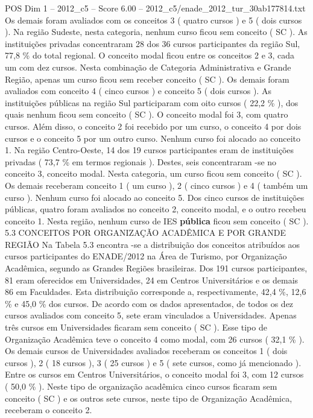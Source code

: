 \begin{textsample}{POS Dim 1 – 2012\_c5 – Score 6.00 – 2012\_c5/enade\_2012\_tur\_30ab177814.txt}
Os demais foram avaliados com os conceitos 3 ( quatro cursos ) e 5 ( dois cursos ).
Na região Sudeste, nesta categoria, nenhum curso ficou sem conceito ( SC ).
As instituições privadas concentraram 28 dos 36 cursos participantes da região Sul, 77,8 \% do total regional.
O conceito modal ficou entre os conceitos 2 e 3, cada um com dez cursos.
Nesta combinação de Categoria Administrativa e Grande Região, apenas um curso ficou sem receber conceito ( SC ).
Os demais foram avaliados com conceito 4 ( cinco cursos ) e conceito 5 ( dois cursos ).
As instituições públicas na região Sul participaram com oito cursos ( 22,2 \% ), dos quais nenhum ficou sem conceito ( SC ).
O conceito modal foi 3, com quatro cursos.
Além disso, o conceito 2 foi recebido por um curso, o conceito 4 por dois cursos e o conceito 5 por um outro curso.
Nenhum curso foi alocado ao conceito 1.
Na região Centro-Oeste, 14 dos 19 cursos participantes eram de instituições privadas ( 73,7 \% em termos regionais ).
Destes, seis concentraram -se no conceito 3, conceito modal.
Nesta categoria, um curso ficou sem conceito ( SC ).
Os demais receberam conceito 1 ( um curso ), 2 ( cinco cursos ) e 4 ( também um curso ).
Nenhum curso foi alocado ao conceito 5.
Dos cinco cursos de instituições públicas, quatro foram avaliados no conceito 2, conceito modal, e o outro recebeu conceito 1.
Nesta região, nenhum curso de IES \textbf{pública} ficou sem conceito ( SC ). 5.3 CONCEITOS POR ORGANIZAÇÃO ACADÊMICA E POR GRANDE REGIÃO Na Tabela 5.3 encontra -se a distribuição dos conceitos atribuídos aos cursos participantes do ENADE/2012 na Área de Turismo, por Organização Acadêmica, segundo as Grandes Regiões brasileiras.
Dos 191 cursos participantes, 81 eram oferecidos em Universidades, 24 em Centros Universitários e os demais 86 em Faculdades.
Esta distribuição corresponde a, respectivamente, 42,4 \%, 12,6 \% e 45,0 \% dos cursos.
De acordo com os dados apresentados, de todos os dez cursos avaliados com conceito 5, sete eram vinculados a Universidades.
Apenas três cursos em Universidades ficaram sem conceito ( SC ).
Esse tipo de Organização Acadêmica teve o conceito 4 como modal, com 26 cursos ( 32,1 \% ).
Os demais cursos de Universidades avaliados receberam os conceitos 1 ( dois cursos ), 2 ( 18 cursos ), 3 ( 25 cursos ) e 5 ( sete cursos, como já mencionado ).
Entre os cursos em Centros Universitários, o conceito modal foi 3, com 12 cursos ( 50,0 \% ).
Neste tipo de organização acadêmica cinco cursos ficaram sem conceito ( SC ) e os outros sete cursos, neste tipo de Organização Acadêmica, receberam o conceito 2.

\end{textsample}
